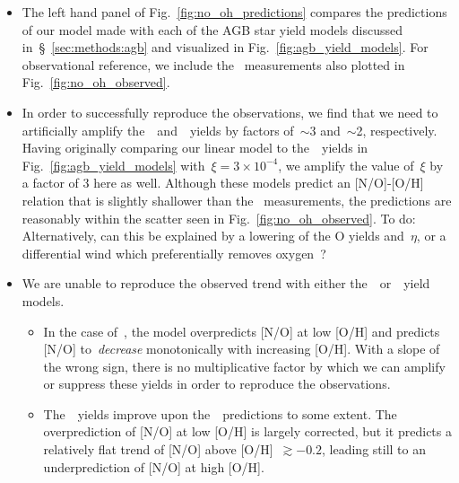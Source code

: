 \documentclass[ms.tex]{subfiles}
\begin{document}
\begin{itemize}
	\item The left hand panel of Fig.~\ref{fig:no_oh_predictions} compares the 
	predictions of our model made with each of the AGB star yield models 
	discussed in~\S~\ref{sec:methods:agb} and visualized in 
	Fig.~\ref{fig:agb_yield_models}. 
	For observational reference, we include the~\citet{Dopita2016} measurements 
	also plotted in Fig.~\ref{fig:no_oh_observed}. 

	\item In order to successfully reproduce the observations, we find that we 
	need to artificially amplify the~\cristallo~and~\ventura~yields by factors 
	of~$\sim$3 and~$\sim$2, respectively. 
	Having originally comparing our linear model to the~\cristallo~yields in 
	Fig.~\ref{fig:agb_yield_models} with~$\xi = 3\times10^{-4}$, we amplify the 
	value of~$\xi$ by a factor of 3 here as well. 
	Although these models predict an [N/O]-[O/H] relation that is slightly 
	shallower than the~\citet{Dopita2016} measurements, the predictions are 
	reasonably within the scatter seen in Fig.~\ref{fig:no_oh_observed}. 
	{\color{red} To do: Alternatively, can this be explained by a lowering of 
	the O yields and~$\eta$, or a differential wind which preferentially 
	removes oxygen~\citep{Vincenzo2016a}}? 

	\item We are unable to reproduce the observed trend with either 
	the~\karakasten~or~\karakas~yield models. 
	\begin{itemize} 
		\item In the case of~\karakasten, the model overpredicts [N/O] at low 
		[O/H] and predicts [N/O] to~\textit{decrease} monotonically with 
		increasing [O/H]. 
		With a slope of the wrong sign, there is no multiplicative factor by 
		which we can amplify or suppress these yields in order to reproduce the 
		observations. 

		\item The~\karakas~yields improve upon the~\karakasten~predictions to 
		some extent. 
		The overprediction of [N/O] at low [O/H] is largely corrected, but it 
		predicts a relatively flat trend of [N/O] above [O/H]~$\gtrsim -0.2$, 
		leading still to an underprediction of [N/O] at high [O/H]. 
	\end{itemize} 


\end{itemize}
\end{document}
